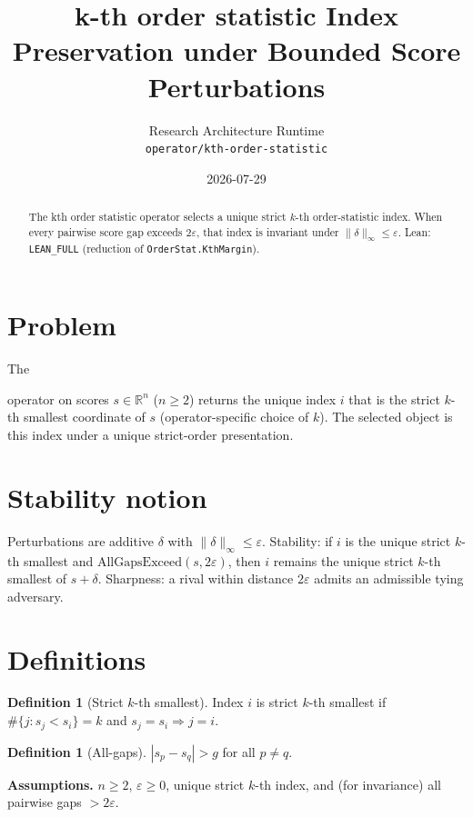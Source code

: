 \documentclass[12pt]{article}
\title{k-th order statistic Index Preservation under Bounded Score Perturbations}
\author{Research Architecture Runtime\\[0.25em]
{\normalsize\texttt{operator/kth-order-statistic}}}
\date{2026-07-29}
\theoremstyle{plain}
\theoremstyle{definition}
\newtheorem{definition}[theorem]{Definition}
\theoremstyle{remark}
\newcommand{\leanpath}[1]{%
  {\raggedright\urlstyle{tt}\path{#1}}}
\begin{document}
\maketitle

\begin{abstract}
The kth order statistic operator selects a unique strict $k$-th order-statistic index. When every pairwise score gap exceeds $2\varepsilon$, that index is invariant under $\|\delta\|_\infty\le\varepsilon$. Lean: \texttt{LEAN\_FULL} (reduction of \texttt{OrderStat.KthMargin}).
\end{abstract}

\noindent
\begin{center}
\end{center}
\vspace{0.6em}

\section{Problem}
{\raggedright\sloppy
The \leanpath{kth-order-statistic} operator on scores $s\in\mathbb{R}^n$ ($n\ge 2$) returns the unique index $i$ that is the strict $k$-th smallest coordinate of $s$ (operator-specific choice of $k$). The selected object is this index under a unique strict-order presentation.
\par}

\section{Stability notion}
Perturbations are additive $\delta$ with $\|\delta\|_\infty\le\varepsilon$. Stability: if $i$ is the unique strict $k$-th smallest and $\mathrm{AllGapsExceed}(s,2\varepsilon)$, then $i$ remains the unique strict $k$-th smallest of $s+\delta$. Sharpness: a rival within distance $2\varepsilon$ admits an admissible tying adversary.

\section{Definitions}
\begin{definition}[Strict $k$-th smallest]
Index $i$ is strict $k$-th smallest if $\#\{j:s_j<s_i\}=k$ and $s_j=s_i\Rightarrow j=i$.
\end{definition}
\begin{definition}[All-gaps]
$|s_p-s_q|>g$ for all $p\neq q$.
\end{definition}
\noindent\textbf{Assumptions.} $n\ge 2$, $\varepsilon\ge 0$, unique strict $k$-th index, and (for invariance) all pairwise gaps $>2\varepsilon$.
\end{document}
